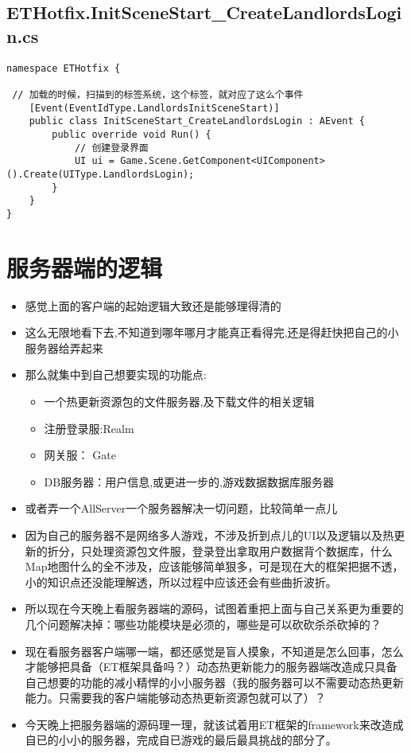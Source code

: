 \documentclass[9pt, b5paper]{article}
\begin{document}
\subsection{ETHotfix.InitSceneStart\_CreateLandlordsLogin.cs}
\label{sec-1-4}
\begin{verbatim}
namespace ETHotfix {

 // 加载的时候，扫描到的标签系统，这个标签，就对应了这么个事件    
    [Event(EventIdType.LandlordsInitSceneStart)]
    public class InitSceneStart_CreateLandlordsLogin : AEvent {
        public override void Run() {
            // 创建登录界面
            UI ui = Game.Scene.GetComponent<UIComponent>().Create(UIType.LandlordsLogin);
        }
    }
}
\end{verbatim}
\section{服务器端的逻辑}
\label{sec-2}
\begin{itemize}
\item 感觉上面的客户端的起始逻辑大致还是能够理得清的
\item 这么无限地看下去,不知道到哪年哪月才能真正看得完,还是得赶快把自己的小服务器给弄起来
\item 那么就集中到自己想要实现的功能点:
\begin{itemize}
\item 一个热更新资源包的文件服务器,及下载文件的相关逻辑
\item 注册登录服:Realm
\item 网关服： Gate
\item DB服务器：用户信息,或更进一步的,游戏数据数据库服务器
\end{itemize}
\item 或者弄一个AllServer一个服务器解决一切问题，比较简单一点儿
\item 因为自己的服务器不是网络多人游戏，不涉及折到点儿的UI以及逻辑以及热更新的折分，只处理资源包文件服，登录登出拿取用户数据背个数据库，什么Map地图什么的全不涉及，应该能够简单狠多，可是现在大的框架把据不透，小的知识点还没能理解透，所以过程中应该还会有些曲折波折。
\item 所以现在今天晚上看服务器端的源码，试图着重把上面与自己关系更为重要的几个问题解决掉：哪些功能模块是必须的，哪些是可以砍砍杀杀砍掉的？
\item 现在看服务器客户端哪一端，都还感觉是盲人摸象，不知道是怎么回事，怎么才能够把具备（ET框架具备吗？）动态热更新能力的服务器端改造成只具备自己想要的功能的减小精悍的小小服务器（我的服务器可以不需要动态热更新能力。只需要我的客户端能够动态热更新资源包就可以了）？
\item 今天晚上把服务器端的源码理一理，就该试着用ET框架的framework来改造成自已的小小的服务器，完成自已游戏的最后最具挑战的部分了。
\end{itemize}
\end{document}
